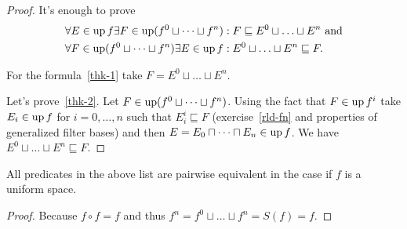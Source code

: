 \begin{proof}
It's enough to prove
\begin{align}
\label{thk-1}&\forall E\in\operatorname{up} f\exists F\in\operatorname{up}(f^0\sqcup\dots\sqcup f^n):F\sqsubseteq E^{0}\sqcup\ldots\sqcup E^{n} \text{ and}\\
\label{thk-2}&\forall F\in\operatorname{up}(f^0\sqcup\dots\sqcup f^n)\exists E\in\operatorname{up} f:E^{0}\sqcup\ldots\sqcup E^{n}\sqsubseteq F.
\end{align}

For the formula~\eqref{thk-1} take $F=E^0\sqcup\dots\sqcup E^n$.

Let's prove~\eqref{thk-2}. Let $F\in\operatorname{up}(f^0\sqcup\dots\sqcup f^n)$. Using the fact that $F\in\operatorname{up} f^i$ take
$E_i\in\operatorname{up} f$ for $i=0,\dots,n$ such that $E_i^i\sqsubseteq F$ (exercise~\ref{rld-fn} and properties of generalized filter bases) and then $E=E_{0}\sqcap\dots\sqcap E_{n}\in\operatorname{up} f$. We have
$E^{0}\sqcup\ldots\sqcup E^{n}\sqsubseteq F$.
\end{proof}
\begin{prop}
All predicates in the above list are pairwise equivalent in the case
if $f$ is a uniform space.\end{prop}
\begin{proof}
Because $f\circ f=f$
and thus $f^n=f^0\sqcup\dots\sqcup f^n=S(f)=f$.\end{proof}

